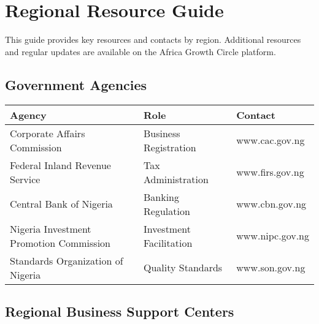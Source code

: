 
\chapter{Regional Resource Guide}\label{ch:regional-resources}

\begin{importantbox}
    This guide provides key resources and contacts by region. Additional resources and regular updates are available on the Africa Growth Circle platform.
\end{importantbox}


\section{Government Agencies}\label{sec:government-agencies}
\vspace{1em}

\begin{center}
    \begin{tabularx}{\textwidth}{>{\raggedright\arraybackslash}X >{\raggedright\arraybackslash}X >{\raggedright\arraybackslash}X}
        \toprule
        \textbf{Agency}                         & \textbf{Role}           & \textbf{Contact} \\
        \midrule
        Corporate Affairs Commission            & Business Registration   & www.cac.gov.ng   \\
        Federal Inland Revenue Service          & Tax Administration      & www.firs.gov.ng  \\
        Central Bank of Nigeria                 & Banking Regulation      & www.cbn.gov.ng   \\
        Nigeria Investment Promotion Commission & Investment Facilitation & www.nipc.gov.ng  \\
        Standards Organization of Nigeria       & Quality Standards       & www.son.gov.ng   \\
        \bottomrule
    \end{tabularx}
\end{center}


\section{Regional Business Support Centers}\label{sec:support-centers}
\vspace{1em}

